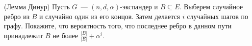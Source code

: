 (Лемма Динур)
Пусть $G$~--- $(n, d, \alpha)$-экспандер и $B \subseteq E$. Выберем случайное ребро из $B$ и случайно один из его
концов. Затем делается $i$ случайных шагов по графу. Покажите, что вероятность того, что последнее ребро в данном пути
принадлежит $B$ не более $\frac{|B|}{|E|} + \alpha^i$.